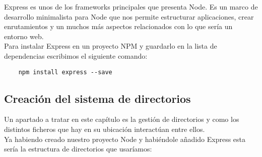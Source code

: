 Express es unos de los frameworks principales que presenta Node. Es un marco de desarrollo minimalista para Node que nos permite estructurar aplicaciones, crear enrutamientos y un muchos más aspectos relacionados con lo que sería un entorno web.
\\Para instalar Express en un proyecto NPM y guardarlo en la lista de dependencias escribimos el siguiente comando:
\begin{verbatim}
    npm install express --save
\end{verbatim}

\subsection{Creación del sistema de directorios}
Un apartado a tratar en este capítulo es la gestión de directorios y como los distintos ficheros que hay en su ubicación interactúan entre ellos.
\\Ya habiendo creado nuestro proyecto Node y habiéndole añadido Express esta sería la estructura de directorios que usaríamos:

